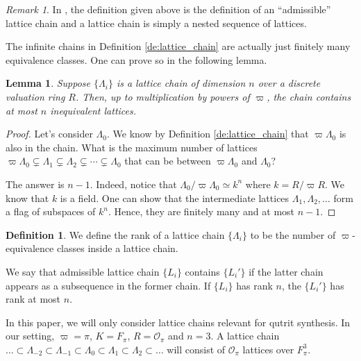 \documentclass{eptcs}
\newtheorem{lemma}[theorem]{Lemma}
\theoremstyle{remark}
\newtheorem{remark}[theorem]{Remark}
\theoremstyle{definition}
\newtheorem{definition}[theorem]{Definition}
\begin{document}
\begin{remark}
\label{re:lattice_chains_admissible}
In \cite{abramenko2002lattice}, the definition given above is the definition of an ``admissible'' lattice chain and a lattice chain is simply a nested sequence of lattices.
\end{remark}

The infinite chains in Definition \ref{de:lattice_chain} are actually just finitely many equivalence classes. One can prove so in the following lemma.
\begin{lemma}
  \label{le:lattice_chains_are_finite}
  Suppose $\{\Lambda_i\}$ is a lattice chain of dimension $n$ over a discrete valuation ring $R$. Then, up to multiplication by powers of $\varpi$, the chain contains at most $n$ inequivalent lattices.
\end{lemma}
\begin{proof}
    Let's consider $\Lambda_{0}$. We know by Definition \ref{de:lattice_chain} that 
    $\varpi \Lambda_{0}$ is also in the chain. What is the maximum number of lattices $ \varpi \Lambda_{0} \subsetneq \Lambda_{1} \subsetneq \Lambda_{2} \subsetneq \cdots \subsetneq \Lambda_{0}$ that can be between
    $\varpi\Lambda_{0}$ and $ \Lambda_{0}$?

    The answer is $n-1$. Indeed, notice that $\Lambda_{0}/ \varpi\Lambda_{0} \simeq k^{n}$ where $k = R/\varpi R$. We know that $k$ is a field. One can show that the intermediate lattices $\Lambda_{1}, \Lambda_{2}, \dots$ form a flag of subspaces of $k^{n}$. Hence, they are finitely many and at most $n-1$.
\end{proof}


\begin{definition}
    We define 
    the rank of a lattice chain $\{\Lambda_{i}\}$
    to be 
    the number of $\varpi$-equivalence classes inside a lattice chain.
\end{definition}

We say that admissible lattice chain $\{L_i\}$ contains $\{ L_i'\}$ if the latter chain appears as a subsequence in the former chain. If $\{L_{i}\}$ has rank $n$, the $\{L_{i}'\}$ has rank at most $n$.

In this paper, we will only consider lattice chains relevant for qutrit synthesis. In our setting, $\varpi = \pi$, $K = F_\pi$, $R= \mathcal{O}_\pi$ and $n=3$. A lattice chain $\dots \subset \Lambda_{-2} \subset \Lambda_{-1} \subset \Lambda_0 \subset \Lambda_1 \subset \Lambda_2 \subset \dots$ will consist of $\mathcal{O}_\pi$ lattices over $F_\pi^3$. 
\end{document}
